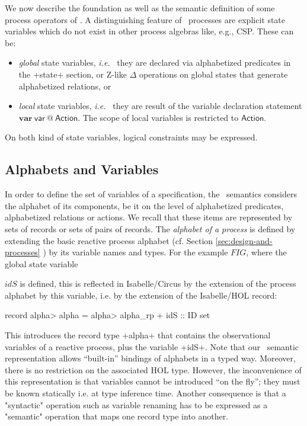 \documentclass[11pt,a4paper]{article}
\newcommand{\ie}{\textit{i.e.}\ }
\begin{document}
We now describe the foundation as well as the semantic definition
of some process operators of \Circus . A distinguishing feature of \Circus\ processes are
explicit state variables which do not exist in other process algebras like, e.g., CSP. 
These can be:
\begin{itemize}
\item \emph{global} state variables, \ie{} they are declared via alphabetized predicates in
the \inlineisar+state+ section, or Z-like $\Delta$ operations on global states that generate
alphabetized relations, or 
\item \emph{local} state variables, \ie{} they are result of the variable declaration statement $\mathsf{\textbf{var}\ var\ @\ Action }$.
         The scope of local variables is restricted to  $\mathsf{Action}$.
\end{itemize}
On both kind of state variables, logical constraints may be expressed.

\subsection{Alphabets and Variables}

In order to define the set of variables of a specification, the \Circus\  semantics %
considers the alphabet of its components,
be it on the level of alphabetized predicates, alphabetized relations or actions. 
We recall that
these items are represented by sets of records or sets of pairs of records. %
The \emph{alphabet of a process} is defined by extending the basic reactive process alphabet (cf. Section \ref{sec:design-and-processes} )
by its %
variable names and types. 
For the  example 
$FIG$, where the global state variable 

$idS$ is defined, this is
reflected in Isabelle/Circus by the extension of the process alphabet by this variable, i.e. by the extension of the Isabelle/HOL record:
\begin{isar}
record \<alpha>  alpha = \<alpha>  alpha_rp +   idS :: ID set
\end{isar}
This introduces the record type \inlineisar+alpha+ that contains the observational variables of a reactive process, plus the variable \inlineisar+idS+.
Note that  our \Circus\ semantic representation allows  ``built-in'' bindings of alphabets in a typed way. 
Moreover, there is no restriction on the associated HOL type. 
However, the inconvenience of this 
representation is that variables cannot be introduced ``on the fly''; they must be known statically i.e. at type inference time. 
Another consequence is that a "syntactic" operation such as variable renaming has to be expressed as a 
"semantic" operation that maps one record type into another.
\end{document}
